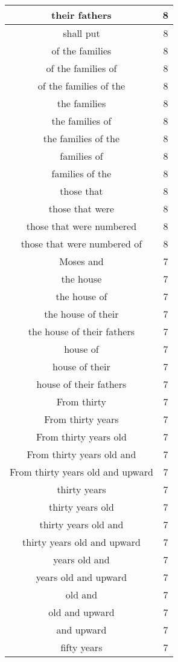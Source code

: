 \begin{center}
\begin{longtable}{|c|c|}
their fathers & 8\\ \hline 
shall put & 8\\ \hline 
of the families & 8\\ \hline 
of the families of & 8\\ \hline 
of the families of the & 8\\ \hline 
the families & 8\\ \hline 
the families of & 8\\ \hline 
the families of the & 8\\ \hline 
families of & 8\\ \hline 
families of the & 8\\ \hline 
those that & 8\\ \hline 
those that were & 8\\ \hline 
those that were numbered & 8\\ \hline 
those that were numbered of & 8\\ \hline 
Moses and & 7\\ \hline 
the house & 7\\ \hline 
the house of & 7\\ \hline 
the house of their & 7\\ \hline 
the house of their fathers & 7\\ \hline 
house of & 7\\ \hline 
house of their & 7\\ \hline 
house of their fathers & 7\\ \hline 
From thirty & 7\\ \hline 
From thirty years & 7\\ \hline 
From thirty years old & 7\\ \hline 
From thirty years old and & 7\\ \hline 
From thirty years old and upward & 7\\ \hline 
thirty years & 7\\ \hline 
thirty years old & 7\\ \hline 
thirty years old and & 7\\ \hline 
thirty years old and upward & 7\\ \hline 
years old and & 7\\ \hline 
years old and upward & 7\\ \hline 
old and & 7\\ \hline 
old and upward & 7\\ \hline 
and upward & 7\\ \hline 
fifty years & 7\\ \hline 

\end{longtable}
\end{center}
